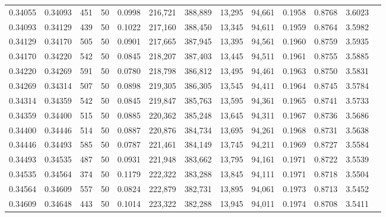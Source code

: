 \begin{tabular}{rrrrrrrrrrrrr}
0.34055 & 0.34093 &   451 &  50 &                                     0.0998 & 216,721 & 388,889 &  13,295 &  94,661 & 0.1958 & 0.8768 & 3.6023 \\
0.34093 & 0.34129 &   439 &  50 &                                     0.1022 & 217,160 & 388,450 &  13,345 &  94,611 & 0.1959 & 0.8764 & 3.5982 \\
0.34129 & 0.34170 &   505 &  50 &                                     0.0901 & 217,665 & 387,945 &  13,395 &  94,561 & 0.1960 & 0.8759 & 3.5935 \\
0.34170 & 0.34220 &   542 &  50 &                                     0.0845 & 218,207 & 387,403 &  13,445 &  94,511 & 0.1961 & 0.8755 & 3.5885 \\
0.34220 & 0.34269 &   591 &  50 &                                     0.0780 & 218,798 & 386,812 &  13,495 &  94,461 & 0.1963 & 0.8750 & 3.5831 \\
0.34269 & 0.34314 &   507 &  50 &                                     0.0898 & 219,305 & 386,305 &  13,545 &  94,411 & 0.1964 & 0.8745 & 3.5784 \\
0.34314 & 0.34359 &   542 &  50 &                                     0.0845 & 219,847 & 385,763 &  13,595 &  94,361 & 0.1965 & 0.8741 & 3.5733 \\
0.34359 & 0.34400 &   515 &  50 &                                     0.0885 & 220,362 & 385,248 &  13,645 &  94,311 & 0.1967 & 0.8736 & 3.5686 \\
0.34400 & 0.34446 &   514 &  50 &                                     0.0887 & 220,876 & 384,734 &  13,695 &  94,261 & 0.1968 & 0.8731 & 3.5638 \\
0.34446 & 0.34493 &   585 &  50 &                                     0.0787 & 221,461 & 384,149 &  13,745 &  94,211 & 0.1969 & 0.8727 & 3.5584 \\
0.34493 & 0.34535 &   487 &  50 &                                     0.0931 & 221,948 & 383,662 &  13,795 &  94,161 & 0.1971 & 0.8722 & 3.5539 \\
0.34535 & 0.34564 &   374 &  50 &                                     0.1179 & 222,322 & 383,288 &  13,845 &  94,111 & 0.1971 & 0.8718 & 3.5504 \\
0.34564 & 0.34609 &   557 &  50 &                                     0.0824 & 222,879 & 382,731 &  13,895 &  94,061 & 0.1973 & 0.8713 & 3.5452 \\
0.34609 & 0.34648 &   443 &  50 &                                     0.1014 & 223,322 & 382,288 &  13,945 &  94,011 & 0.1974 & 0.8708 & 3.5411 \\

\end{tabular}
